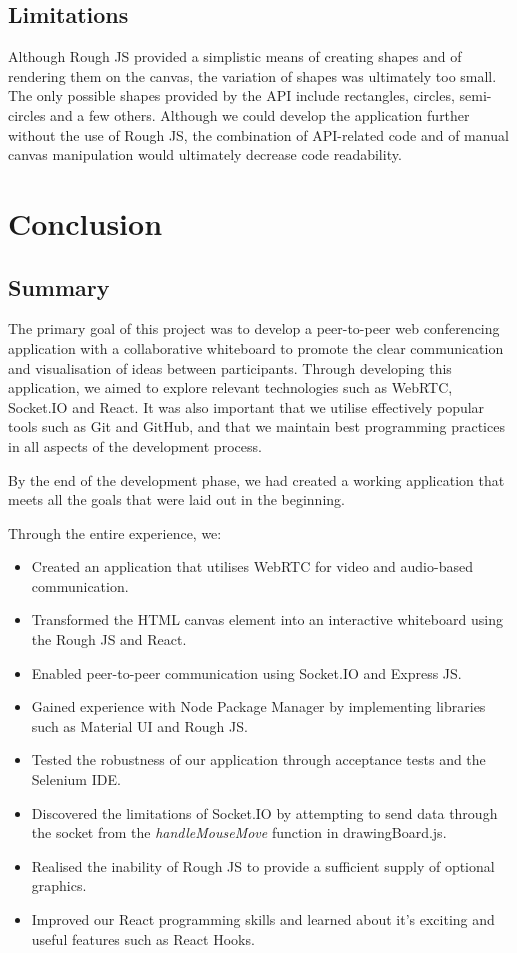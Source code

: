 \section{Limitations}
Although Rough JS provided a simplistic means of creating shapes and of rendering them on the canvas, the variation of shapes was ultimately too small. The only possible shapes provided by the API include rectangles, circles, semi-circles and a few others. Although we could develop the application further without the use of Rough JS, the combination of API-related code and of manual canvas manipulation would ultimately decrease code readability.  

\chapter{Conclusion}
\section{Summary}
The primary goal of this project was to develop a peer-to-peer web conferencing application with a collaborative whiteboard to promote the clear communication and visualisation of ideas between participants. Through developing this application, we aimed to explore relevant technologies such as WebRTC, Socket.IO and React. It was also important that we utilise effectively popular tools such as Git and GitHub, and that we maintain best programming practices in all aspects of the development process.  

By the end of the development phase, we had created a working application that meets all the goals that were laid out in the beginning.  

Through the entire experience, we: 
\begin{itemize}
    \item Created an application that utilises WebRTC for video and audio-based communication. 
    \item Transformed the HTML canvas element into an interactive whiteboard using the Rough JS and React. 
    \item Enabled peer-to-peer communication using Socket.IO and Express JS. 
    \item Gained experience with Node Package Manager by implementing libraries such as Material UI and Rough JS. 
    \item Tested the robustness of our application through acceptance tests and the Selenium IDE.  
    \item Discovered the limitations of Socket.IO by attempting to send data through the socket from the \textit{handleMouseMove} function in drawingBoard.js.  
    \item Realised the inability of Rough JS to provide a sufficient supply of optional graphics.  
    \item Improved our React programming skills and learned about it’s exciting and useful features such as React Hooks.  
\end{itemize}

